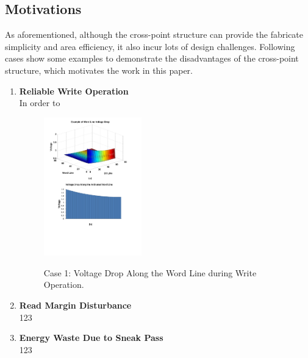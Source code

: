 \subsection{Motivations}
As aforementioned, although the cross-point structure can provide the fabricate simplicity and area efficiency, it also incur lots of design challenges. Following cases show some examples to demonstrate the disadvantages of the cross-point structure, which motivates the work in this paper.
\begin{enumerate}
  \item \textbf{Reliable Write Operation}\\
  In order to
  
\begin{figure}
\centering
  \includegraphics[width=0.4\textwidth]{./figures/example1_large.pdf}\\
  \caption{Case 1: Voltage Drop Along the Word Line during Write Operation.}\label{fig:exampl1}
\end{figure}
  
  \item \textbf{Read Margin Disturbance}\\
  123
  \item \textbf{Energy Waste Due to Sneak Pass}\\
  123
\end{enumerate}

~\cite{crossbar_NANO08_Nauenheim}~\cite{memristor:analog}~\cite{moore}

